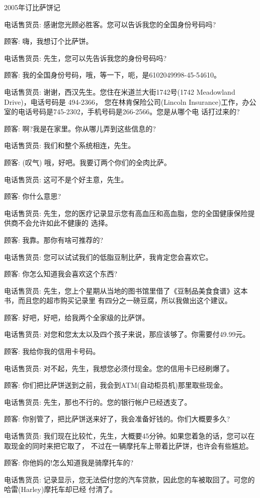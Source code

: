 ﻿\documentclass[11pt]{article}
\begin{document}
2005年订比萨饼记

电话售货员: 感谢您光顾必胜客。您可以告诉我您的全国身份号码吗?

顾客: 嗨，我想订个比萨饼。

电话售货员: 先生，您可以先告诉我您的身份号码吗?

顾客: 我的全国身份号码，哦，等一下，呃，是6102049998-45-54610。

电话售货员: 谢谢，西汉先生。您住在米道兰大街1742号(1742 Meadowland Drive)，电话号码是 494-2366，
您在林肯保险公司(Lincoln Insurance)工作，办公室的电话号码是745-2302，手机号码是266-2566。您是从哪个电
话打过来的?

顾客: 啊?我是在家里。你从哪儿弄到这些信息的?

电话售货员: 我们和整个系统相连，先生。

顾客: (叹气) 哦，好吧。我要订两个你们的全肉比萨。

电话售货员: 这可不是个好主意，先生。

顾客: 你什么意思?

电话售货员: 先生，您的医疗记录显示您有高血压和高血脂，您的全国健康保险提供商不会允许如此不健康的
选择。

顾客: 我靠。那你有啥可推荐的?

电话售货员: 您可以试试我们的低脂豆制比萨，我肯定您会喜欢它。

顾客: 你怎么知道我会喜欢这个东西?

电话售货员: 先生，您上个星期从当地的图书馆里借了《豆制品美食食谱》这本书，而且您的超市购买记录里
有四分之一磅豆腐，所以我做出这个建议。

顾客: 好吧，好吧，给我两个全家级的比萨饼。

电话售货员: 对您和您太太以及四个孩子来说，那应该够了。你需要付49.99元。

顾客: 我给你我的信用卡号码。

电话售货员: 对不起，先生，我想您必须付现金。您的信用卡已经刷爆了。

顾客: 你们把比萨饼送到之前，我会到ATM(自动柜员机)那里取些现金。

电话售货员: 先生，那也不行的。您的银行帐户已经透支了。

顾客: 你别管了，把比萨饼送来好了，我会准备好钱的。你们大概要多久?

电话售货员: 我们现在比较忙，先生，大概要45分钟。如果您着急的话，您可以在取现金的同时来把它取了，
不过在一辆摩托车上带着比萨饼，也许会有些尴尬。

顾客: 你他妈的!怎么知道我是骑摩托车的?

电话售货员: 记录显示，您无法偿付您的汽车贷款，因此您的车被取回了。可您的哈雷(Harley)摩托车却已经
付清了。
\end{document}

